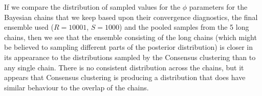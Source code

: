 \documentclass[]{article}
\begin{document}

If we compare the distribution of sampled values for the $\phi$ parameters for the Bayesian chains that we keep based upon their convergence diagnostics, the final ensemble used ($R=10001$, $S=1000$) and the pooled samples from the 5 long chains, then we see that the ensemble consisting of the long chains (which might be believed to sampling different parts of the posterior distribution) is closer in its appearance to the distributions sampled by the Consensus clustering than to any single chain. There is no consistent distribution across the chains, but it appears that Consensus clustering is producing a distribution that does have similar behaviour to the overlap of the chains.
\end{document}
